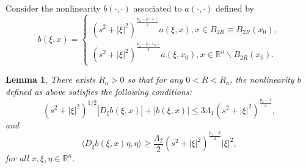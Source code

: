 \documentclass[a4paper,10pt]{amsart}
\newtheorem{lem}[thm]{Lemma}
\newcommand{\f}{\frac}
\newcommand{\Rn}{\mathbb{R}^n}
\begin{document}
Consider the nonlinearity $b(\cdot,\cdot)$ associated to $a(\cdot,\cdot)$ defined by
\begin{equation}\label{eq-b}
b(\xi,x)=\begin{cases}
(s^2+|\xi|^2)^{\f{p_2-p(x)}{2}}a(\xi,x), x\in B_{2R}\equiv B_{2R}(x_0),\\
(s^2+|\xi|^2)^{\f{p_2-p(x_0)}{2}}a(\xi,x_0), x\in  \Rn\backslash B_{2R}(x_0).
\end{cases}
\end{equation}
\begin{lem}\label{lem-nonlinearity b}
There exists $R_a>0$ so that for any $0<R<R_a$, the nonlinearity $b$ defined as above satisfies the following conditions:
\begin{equation}\label{eq1-functionb}
(s^2+|\xi|^2)^{1/2}|D_\xi b(\xi,x)|+|b(\xi,x)|\leq 3\Lambda_1 (s^2+|\xi|^2)^{\f{p_2-1}{2}},
\end{equation}
and
\begin{equation}\label{eq2-functionb}
\langle D_\xi b(\xi,x)\eta, \eta \rangle  \geq \f{\Lambda_2}{2} (s^2+|\xi|^2)^{\f{p_2-2}{2}}|\xi|^2,
\end{equation}
for all $x,\xi,\eta \in \mathbb{R}^n$.
\end{lem}
\end{document}
